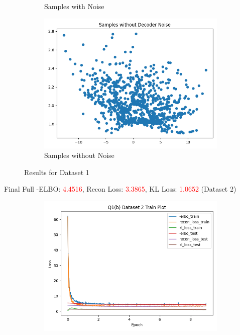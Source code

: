 \documentclass{article}
\begin{document}
\begin{enumerate}[(a)]
\begin{figure}[H]
\begin{subfigure}{0.32\textwidth}
        \caption{Samples with Noise}
    \end{subfigure}
    \begin{subfigure}{0.32\textwidth}
        \centering
        \includegraphics[width=\textwidth]{figures/q1_b_dset1_sample_without_noise.png}
        \caption{Samples without Noise}
    \end{subfigure}
    \caption{Results for Dataset 1}
\end{figure}
Final Full -ELBO: \textcolor{red}{4.4516}, Recon Loss: \textcolor{red}{3.3865}, KL Loss: \textcolor{red}{1.0652} (Dataset 2)
\begin{figure}[H]
    \centering
    \begin{subfigure}{0.32\textwidth}
        \centering
        \includegraphics[width=\textwidth]{figures/q1_b_dset2_train_plot.png}

\end{subfigure}
\end{figure}
\end{enumerate}
\end{document}
